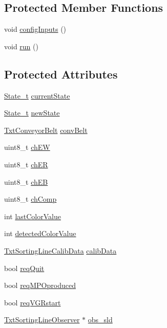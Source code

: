 \subsection*{Protected Member Functions}
\begin{DoxyCompactItemize}
\item 
void \hyperlink{classft_1_1_txt_sorting_line_a7a0ede5e3ff90b2e7ab8d8c7122266e1}{config\+Inputs} ()
\item 
void \hyperlink{classft_1_1_txt_sorting_line_a4e52b1fb929b8a1188c9bed30e58265c}{run} ()
\end{DoxyCompactItemize}
\subsection*{Protected Attributes}
\begin{DoxyCompactItemize}
\item 
\hyperlink{classft_1_1_txt_sorting_line_a02aa5385ab3fe32f2c3ca14a56e5ba57}{State\+\_\+t} \hyperlink{classft_1_1_txt_sorting_line_a07fbad8954da285e09bb00be2a8572fc}{current\+State}
\item 
\hyperlink{classft_1_1_txt_sorting_line_a02aa5385ab3fe32f2c3ca14a56e5ba57}{State\+\_\+t} \hyperlink{classft_1_1_txt_sorting_line_ae30ca701f2cfdd903f76cca9a4d4c63a}{new\+State}
\item 
\hyperlink{classft_1_1_txt_conveyor_belt}{Txt\+Conveyor\+Belt} \hyperlink{classft_1_1_txt_sorting_line_a847cafa9e7df877377ed94b129e261ba}{conv\+Belt}
\item 
uint8\+\_\+t \hyperlink{classft_1_1_txt_sorting_line_a6262093bb211a1b20c70b5d7103b397d}{ch\+EW}
\item 
uint8\+\_\+t \hyperlink{classft_1_1_txt_sorting_line_af874e031d2a215da547fc9b7fbe67e22}{ch\+ER}
\item 
uint8\+\_\+t \hyperlink{classft_1_1_txt_sorting_line_ac18c62de7c049c7c94759b821a154123}{ch\+EB}
\item 
uint8\+\_\+t \hyperlink{classft_1_1_txt_sorting_line_a562216986aad316c55c012c2b337230c}{ch\+Comp}
\item 
int \hyperlink{classft_1_1_txt_sorting_line_aa5348f57a65cd896494c735c16585b75}{last\+Color\+Value}
\item 
int \hyperlink{classft_1_1_txt_sorting_line_a8274883aa26b9c89081ad40e86f88cf7}{detected\+Color\+Value}
\item 
\hyperlink{classft_1_1_txt_sorting_line_calib_data}{Txt\+Sorting\+Line\+Calib\+Data} \hyperlink{classft_1_1_txt_sorting_line_a58beff60223435da4eab6aff3443dc67}{calib\+Data}
\item 
bool \hyperlink{classft_1_1_txt_sorting_line_a456c088610779e8b77925a40171e4687}{req\+Quit}
\item 
bool \hyperlink{classft_1_1_txt_sorting_line_a38dfabdf03d7e435e8a4517b3fa8bbd9}{req\+M\+P\+Oproduced}
\item 
bool \hyperlink{classft_1_1_txt_sorting_line_a6e9c2cb70b22ddee0e38233aa78cd96a}{req\+V\+G\+Rstart}
\item 
\hyperlink{classft_1_1_txt_sorting_line_observer}{Txt\+Sorting\+Line\+Observer} $\ast$ \hyperlink{classft_1_1_txt_sorting_line_a7378daf49a78d447da341f7fed2e020e}{obs\+\_\+sld}
\end{DoxyCompactItemize}
